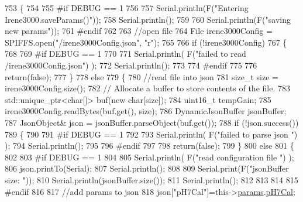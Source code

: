 \begin{DoxyCode}
753 \{
754 
755 \textcolor{preprocessor}{#if DEBUG == 1}
756         
757     Serial.println(F(\textcolor{stringliteral}{"Entering Irene3000.saveParams()"}));
758     Serial.println();
759     
760     Serial.println(F(\textcolor{stringliteral}{"saving new params"}));
761 \textcolor{preprocessor}{#endif}
762     
763     \textcolor{comment}{//open file}
764     File irene3000Config = SPIFFS.open(\textcolor{stringliteral}{"/irene3000Config.json"}, \textcolor{stringliteral}{"r"});
765 
766     \textcolor{keywordflow}{if} (!irene3000Config) 
767     \{
768     
769 \textcolor{preprocessor}{    #if DEBUG == 1 }
770 
771         Serial.println( F(\textcolor{stringliteral}{"failed to read /irene3000Config.json"}) );
772         Serial.println();
773     
774 \textcolor{preprocessor}{    #endif}
775 
776         \textcolor{keywordflow}{return}(\textcolor{keyword}{false});
777     \}
778     \textcolor{keywordflow}{else}
779     \{
780         \textcolor{comment}{//read file into json}
781         \textcolor{keywordtype}{size\_t} size = irene3000Config.size();
782         \textcolor{comment}{// Allocate a buffer to store contents of the file.}
783         std::unique\_ptr<char[]> buf(\textcolor{keyword}{new} \textcolor{keywordtype}{char}[size]);
784             uint16\_t tempGain;
785         irene3000Config.readBytes(buf.get(), size);
786         DynamicJsonBuffer jsonBuffer;
787         JsonObject& json = jsonBuffer.parseObject(buf.get());
788         \textcolor{keywordflow}{if} (!json.success()) 
789         \{
790         
791 \textcolor{preprocessor}{        #if DEBUG == 1 }
792 
793             Serial.println( F(\textcolor{stringliteral}{"failed to parse json "}) );
794             Serial.println();
795         
796 \textcolor{preprocessor}{        #endif}
797             
798             \textcolor{keywordflow}{return}(\textcolor{keyword}{false});
799         \} 
800         \textcolor{keywordflow}{else}
801         \{
802         
803 \textcolor{preprocessor}{        #if DEBUG == 1 }
804     
805             Serial.println( F(\textcolor{stringliteral}{"read configuration file "}) );
806             json.printTo(Serial);
807             Serial.println();
808 
809             Serial.print(F(\textcolor{stringliteral}{"jsonBuffer size: "}));
810             Serial.println(jsonBuffer.size());
811             Serial.println();
812 
813         
814 
815 \textcolor{preprocessor}{        #endif          }
816     
817             \textcolor{comment}{//add params to json}
818             json[\textcolor{stringliteral}{"pH7Cal"}]=this->\hyperlink{class_irene3000_a136585a5ee7f9ac6ab52175fa153f8e3}{params}.\hyperlink{struct_irene3000_1_1parameters___t_a21265466a570d84bff914f26d2f7a03e}{pH7Cal};

\end{DoxyCode}

